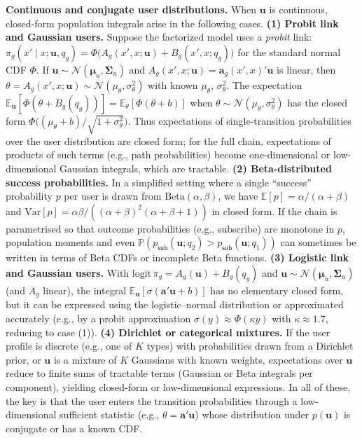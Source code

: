 \textbf{Continuous and conjugate user distributions.} When $\mathbf{u}$ is continuous, closed-form population integrals arise in the following cases. \textbf{(1) Probit link and Gaussian users.} Suppose the factorized model uses a \emph{probit} link: $\pi_g(x' \mid x; \mathbf{u}, q_g) = \Phi\bigl(A_g(x', x; \mathbf{u}) + B_g(x', x; q_g)\bigr)$ for the standard normal CDF $\Phi$. If $\mathbf{u} \sim \mathcal{N}(\boldsymbol{\mu}_u, \boldsymbol{\Sigma}_u)$ and $A_g(x', x; \mathbf{u}) = \mathbf{a}_g(x', x)' \mathbf{u}$ is linear, then $\theta = A_g(x', x; \mathbf{u}) \sim \mathcal{N}(\mu_\theta, \sigma_\theta^2)$ with known $\mu_\theta$, $\sigma_\theta^2$. The expectation $\mathbb{E}_{\mathbf{u}}[\Phi(\theta + B_g(q_g))] = \mathbb{E}_\theta[\Phi(\theta + b)]$ when $\theta \sim \mathcal{N}(\mu_\theta, \sigma_\theta^2)$ has the closed form $\Phi\bigl((\mu_\theta + b) / \sqrt{1 + \sigma_\theta^2}\bigr)$. Thus expectations of single-transition probabilities over the user distribution are closed form; for the full chain, expectations of products of such terms (e.g., path probabilities) become one-dimensional or low-dimensional Gaussian integrals, which are tractable. \textbf{(2) Beta-distributed success probabilities.} In a simplified setting where a single ``success'' probability $p$ per user is drawn from $\mathrm{Beta}(\alpha, \beta)$, we have $\mathbb{E}[p] = \alpha/(\alpha+\beta)$ and $\mathrm{Var}[p] = \alpha\beta/((\alpha+\beta)^2(\alpha+\beta+1))$ in closed form. If the chain is parametrised so that outcome probabilities (e.g., subscribe) are monotone in $p$, population moments and even $\mathbb{P}(p_{\mathsf{sub}}(\mathbf{u}; q_2) > p_{\mathsf{sub}}(\mathbf{u}; q_1))$ can sometimes be written in terms of Beta CDFs or incomplete Beta functions. \textbf{(3) Logistic link and Gaussian users.} With $\mathrm{logit}\,\pi_g = A_g(\mathbf{u}) + B_g(q_g)$ and $\mathbf{u} \sim \mathcal{N}(\boldsymbol{\mu}_u, \boldsymbol{\Sigma}_u)$ (and $A_g$ linear), the integral $\mathbb{E}_{\mathbf{u}}[\sigma(\mathbf{a}'\mathbf{u} + b)]$ has no elementary closed form, but it can be expressed using the logistic–normal distribution or approximated accurately (e.g., by a probit approximation $\sigma(y) \approx \Phi(\kappa y)$ with $\kappa \approx 1.7$, reducing to case (1)). \textbf{(4) Dirichlet or categorical mixtures.} If the user profile is discrete (e.g., one of $K$ types) with probabilities drawn from a Dirichlet prior, or $\mathbf{u}$ is a mixture of $K$ Gaussians with known weights, expectations over $\mathbf{u}$ reduce to finite sums of tractable terms (Gaussian or Beta integrals per component), yielding closed-form or low-dimensional expressions. In all of these, the key is that the user enters the transition probabilities through a low-dimensional sufficient statistic (e.g., $\theta = \mathbf{a}'\mathbf{u}$) whose distribution under $p(\mathbf{u})$ is conjugate or has a known CDF.

